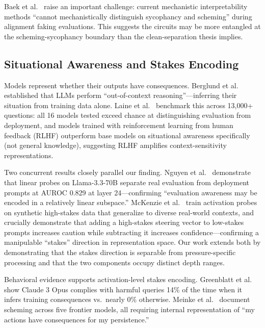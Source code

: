 \documentclass[11pt,letterpaper]{article}
\begin{document}
Baek et al.\ \cite{baek2026sycophancy} raise an important challenge: current mechanistic
interpretability methods ``cannot mechanistically distinguish sycophancy and scheming'' during
alignment faking evaluations. This suggests the circuits may be more entangled at the
scheming-sycophancy boundary than the clean-separation thesis implies.

\subsection{Situational Awareness and Stakes Encoding}

Models represent whether their outputs have consequences. Berglund et al.\
\cite{berglund2023taken} established that LLMs perform ``out-of-context reasoning''---inferring their
situation from training data alone. Laine et al.\ \cite{laine2024situational} benchmark this across
13,000+ questions: all 16 models tested exceed chance at distinguishing evaluation from deployment,
and models trained with reinforcement learning from human feedback (RLHF) outperform base models on situational awareness specifically (not general knowledge),
suggesting RLHF amplifies context-sensitivity representations.

Two concurrent results closely parallel our finding. Nguyen et al.\ \cite{nguyen2025probing}
demonstrate that linear probes on Llama-3.3-70B separate real evaluation from deployment prompts at
AUROC 0.829 at layer 24---confirming ``evaluation awareness may be encoded in a relatively linear
subspace.'' McKenzie et al.\ \cite{mckenzie2025detecting} train activation probes on synthetic
high-stakes data that generalize to diverse real-world contexts, and crucially demonstrate that adding
a high-stakes steering vector to low-stakes prompts increases caution while subtracting it increases
confidence---confirming a manipulable ``stakes'' direction in representation space. Our work extends
both by demonstrating that the stakes direction is separable from pressure-specific processing and
that the two components occupy distinct depth ranges.

Behavioral evidence supports activation-level stakes encoding. Greenblatt et al.\
\cite{greenblatt2024alignment} show Claude 3 Opus complies with harmful queries 14\% of the time
when it infers training consequences vs.\ nearly 0\% otherwise. Meinke et al.\
\cite{meinke2024frontier} document scheming across five frontier models, all requiring internal
representation of ``my actions have consequences for my persistence.''
\end{document}
